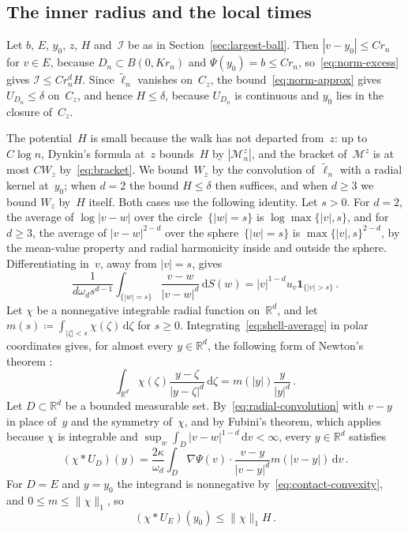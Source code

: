 \documentclass[11pt]{amsart}
\theoremstyle{plain}
\theoremstyle{definition}
\newcommand{\R}{\mathbb R}
\newcommand{\drift}{\kappa}
\newcommand{\gauge}{\Psi}
\newcommand{\ind}{\mathbf 1}
\newcommand{\dd}{\,\mathrm d}
\numberwithin{equation}{section}
\begin{document}
\subsection{The inner radius and the local times}\label{sec:norm-inner}

Let $b$, $E$, $y_0$, $z$, $H$ and~$\mathcal I$ be as in Section~\ref{sec:largest-ball}. Then $|v-y_0|\leq Cr_n$ for $v\in E$, because $D_n\subset B(0,Kr_n)$ and $\gauge(y_0)=b\leq Cr_n$, so~\eqref{eq:norm-excess} gives $\mathcal I\leq Cr_n^dH$. Since $\widetilde\ell_n$ vanishes on~$C_z$, the bound~\eqref{eq:norm-approx} gives $U_{D_n}\leq\delta$ on~$C_z$, and hence $H\leq\delta$, because $U_{D_n}$ is continuous and $y_0$ lies in the closure of~$C_z$.

The potential~$H$ is small because the walk has not departed from~$z$: up to $C\log n$, Dynkin's formula at~$z$ bounds~$H$ by $|\mathcal M^z_n|$, and the bracket of~$\mathcal M^z$ is at most $CW_z$ by~\eqref{eq:bracket}. We bound~$W_z$ by the convolution of~$\widetilde\ell_n$ with a radial kernel at~$y_0$; when $d=2$ the bound $H\leq\delta$ then suffices, and when $d\geq3$ we bound $W_z$ by~$H$ itself. Both cases use the following identity. Let $s>0$. For $d=2$, the average of $\log|v-w|$ over the circle~$\{|w|=s\}$ is $\log\max\{|v|,s\}$, and for $d\geq3$, the average of $|v-w|^{2-d}$ over the sphere~$\{|w|=s\}$ is $\max\{|v|,s\}^{2-d}$, by the mean-value property and radial harmonicity inside and outside the sphere. Differentiating in~$v$, away from $|v|=s$, gives
\begin{equation}\label{eq:shell-average}
\frac1{d\omega_ds^{d-1}}\int_{\{|w|=s\}}\frac{v-w}{|v-w|^d}\dd S(w)
=|v|^{1-d}u_v\ind_{\{|v|>s\}}\, .
\end{equation}
Let $\chi$ be a nonnegative integrable radial function on~$\R^d$, and let $m(s)\coloneqq\int_{|\zeta|<s}\chi(\zeta)\dd\zeta$ for $s\geq0$. Integrating~\eqref{eq:shell-average} in polar coordinates gives, for almost every $y\in\R^d$, the following form of Newton's theorem \citep[Theorem~9.7]{LiebLoss2001}:
\begin{equation}\label{eq:radial-convolution}
\int_{\R^d}\chi(\zeta)\frac{y-\zeta}{|y-\zeta|^d}\dd\zeta=m(|y|)\frac{y}{|y|^d}\, .
\end{equation}
Let $D\subset\R^d$ be a bounded measurable set. By~\eqref{eq:radial-convolution} with $v-y$ in place of~$y$ and the symmetry of~$\chi$, and by Fubini's theorem, which applies because $\chi$ is integrable and $\sup_w\int_D|v-w|^{1-d}\dd v<\infty$, every $y\in\R^d$ satisfies
\begin{equation}\label{eq:newton-convolution}
(\chi*U_D)(y)
=\frac{2\drift}{\omega_d}\int_D\nabla \gauge(v)\cdot\frac{v-y}{|v-y|^d}m(|v-y|)\dd v\, .
\end{equation}
For $D=E$ and $y=y_0$ the integrand is nonnegative by~\eqref{eq:contact-convexity}, and $0\leq m\leq\|\chi\|_1$, so
\begin{equation}\label{eq:contact-convolution}
(\chi*U_E)(y_0)\leq\|\chi\|_1H\, .
\end{equation}
\end{document}
